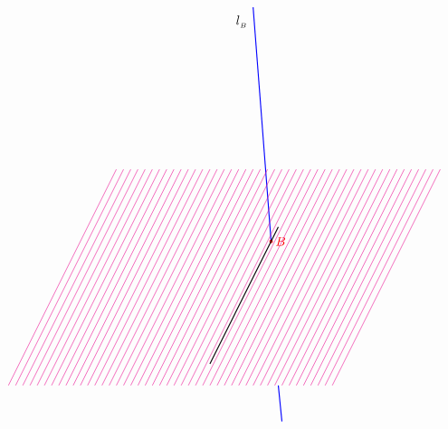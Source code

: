 \documentclass[12pt]{article}
\numberwithin{equation}{section}
\begin{document}
\begin{equation}
\begin{tikzpicture}
\draw [blue, thick] (-2.2,-3)--(-2.3,-2);

\draw [blue, thick] (-2.5,2)--(-3,8.5);
\node [right] at (-3.6,8.1) {$l_{_B}$};
\draw [red, thick] (-2.5,2) circle (1pt);
\node [right,red] at (-2.5,2) {$B$};


\draw [thick] (-4.2, -1.4)--(-2.3,2.4);


\draw [   magenta, thin] (-9.8,-2)--(-6.8,4);
\draw [   magenta, thin] (-9.6,-2)--(-6.6,4);
\draw [   magenta, thin] (-9.4,-2)--(-6.4,4);
\draw [   magenta, thin] (-9.2,-2)--(-6.2,4);
\draw [   magenta, thin] (-9.0,-2)--(-6.0,4);
\draw [   magenta, thin] (-8.8,-2)--(-5.8,4);
\draw [   magenta, thin] (-8.6,-2)--(-5.6,4);
\draw [   magenta, thin] (-8.4,-2)--(-5.4,4);
\draw [   magenta, thin] (-8.2,-2)--(-5.2,4);
\draw [   magenta, thin] (-8.0,-2)--(-5.0,4);
\draw [   magenta, thin] (-7.8,-2)--(-4.8,4);
\draw [   magenta, thin] (-7.6,-2)--(-4.6,4);
\draw [   magenta, thin] (-7.4,-2)--(-4.4,4);
\draw [   magenta, thin] (-7.2,-2)--(-4.2,4);
\draw [   magenta, thin] (-7.0,-2)--(-4.0,4);
\draw [   magenta, thin] (-6.8,-2)--(-3.8,4);
\draw [   magenta, thin] (-6.6,-2)--(-3.6,4);
\draw [   magenta, thin] (-6.4,-2)--(-3.4,4);
\draw [   magenta, thin] (-6.2,-2)--(-3.2,4);
\draw [   magenta, thin] (-6.0,-2)--(-3.0,4);
\draw [   magenta, thin] (-5.8,-2)--(-2.8,4);
\draw [   magenta, thin] (-5.6,-2)--(-2.6,4);
\draw [   magenta, thin] (-5.4,-2)--(-2.4,4);
\draw [   magenta, thin] (-5.2,-2)--(-2.2,4);
\draw [   magenta, thin] (-5.0,-2)--(-2.0,4);
\draw [   magenta, thin] (-4.8,-2)--(-1.8,4);
\draw [   magenta, thin] (-4.6,-2)--(-1.6,4);
\draw [   magenta, thin] (-4.4,-2)--(-1.4,4);
\draw [   magenta, thin] (-4.2,-2)--(-1.2,4);
\draw [   magenta, thin] (-4.0,-2)--(-1.0,4);
\draw [   magenta, thin] (-3.8,-2)--(-0.8,4);
\draw [   magenta, thin] (-3.6,-2)--(-0.6,4);
\draw [   magenta, thin] (-3.4,-2)--(-0.4,4);
\draw [   magenta, thin] (-3.2,-2)--(-0.2,4);
\draw [   magenta, thin] (-3.0,-2)--(0.0,4);
\draw [   magenta, thin] (-2.8,-2)--(0.2,4);
\draw [   magenta, thin] (-2.6,-2)--(0.4,4);
\draw [   magenta, thin] (-2.4,-2)--(0.6,4);
\draw [   magenta, thin] (-2.2,-2)--(0.8,4);
\draw [   magenta, thin] (-2.0,-2)--(1.0 ,4);
\draw [   magenta, thin] (-1.8,-2)--(1.2,4);
\draw [   magenta, thin] (-1.6,-2)--(1.4,4);
\draw [   magenta, thin] (-1.4,-2)--(1.6,4);
\draw [   magenta, thin] (-1.2,-2)--(1.8,4);
\draw [   magenta, thin] (-1.0,-2)--(2,4);
\draw [   magenta, thin] (-0.8,-2)--(2.2,4);

\end{tikzpicture}
\end{equation}
\end{document}
